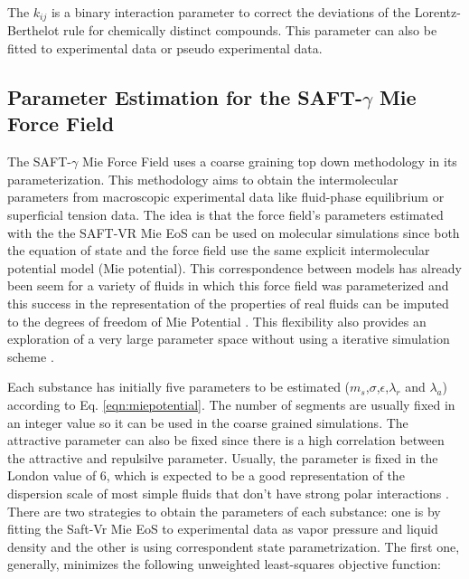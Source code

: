 The $k_{ij}$ is a binary interaction parameter to correct the deviations of the Lorentz-Berthelot rule for chemically distinct compounds. This parameter can also be fitted to experimental data or pseudo experimental data.

\subsection{Parameter Estimation for the SAFT-$\gamma$ Mie Force Field}

The SAFT-$\gamma$ Mie Force Field uses a coarse graining top down methodology in its parameterization. This methodology aims to obtain the intermolecular parameters from macroscopic experimental data like fluid-phase equilibrium or superficial tension data. The idea is that the force field's  parameters estimated with the the SAFT-VR Mie EoS can be used on molecular simulations since both the equation of state and the force field use the same explicit intermolecular potential model (Mie potential). This correspondence between models has already been seem for a variety of fluids in which this force field was parameterized and  this success in the representation of the properties of real fluids can be imputed to the degrees of freedom of Mie Potential \cite{herdes2015}. This flexibility also provides an exploration of a very large parameter space without using a iterative simulation scheme \cite{avendano2011}. 

Each substance has initially five parameters to be estimated ($m_s$,$\sigma$,$\epsilon$,$\lambda_{r}$ and $\lambda_{a}$) according to Eq. \eqref{eqn:miepotential}. The number of segments are usually fixed in an integer value so it can be used in the coarse grained simulations. The attractive parameter can also be fixed since there is a high correlation between the attractive and repulsilve parameter. Usually, the parameter is fixed in the London value of 6, which is expected to be a good representation of the dispersion scale of most simple fluids that don't have strong polar interactions \cite{ramrattan2015,herdes2015}. There are two strategies to obtain the parameters of each substance: one is by fitting the Saft-Vr Mie EoS to experimental data as vapor pressure and liquid density and the other is using correspondent state parametrization. The first one, generally, minimizes the following unweighted least-squares objective function:


